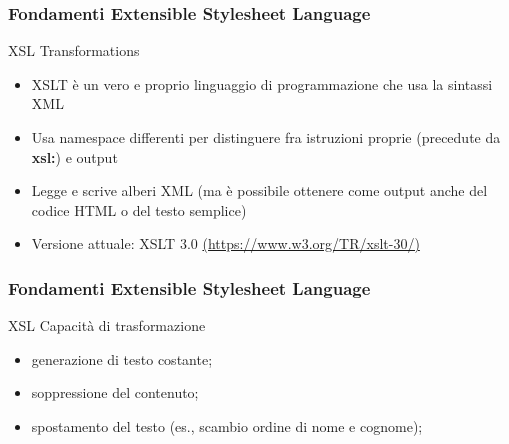 \begin{frame}
    \frametitle{Fondamenti Extensible Stylesheet Language}
    \addtocounter{nframe}{1}
    

     \begin{block}{XSL Transformations}
         \begin{itemize}
            \item XSLT è un vero e proprio linguaggio di programmazione che usa la sintassi XML
            \item Usa namespace differenti per distinguere fra istruzioni proprie (precedute da \textbf{xsl:}) e output
            \item Legge e scrive alberi XML (ma è possibile ottenere come output anche del
            codice HTML o del testo semplice)
            \item Versione attuale: XSLT 3.0 \url{(https://www.w3.org/TR/xslt-30/)}
        \end{itemize}
     \end{block}
    
\end{frame}

\begin{frame}
    \frametitle{Fondamenti Extensible Stylesheet Language}
    \addtocounter{nframe}{1}
    

     \begin{block}{XSL Capacità di trasformazione}
         \begin{itemize}
            \item generazione di testo costante;
            \item soppressione del contenuto;
            \item spostamento del testo (es., scambio ordine di nome e cognome);
        \end{itemize}
     \end{block}
    
\end{frame}

